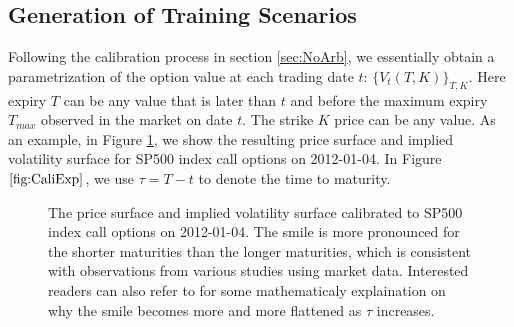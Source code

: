 \documentclass[letterpaper,12pt,titlepage,oneside,final]{book}
\numberwithin{equation}{section}
\theoremstyle{definition}
\begin{document}
\subsection{Generation of Training Scenarios}
\label{sec:Augtrain}
Following the calibration process in section \ref{sec:NoArb}, we essentially obtain a parametrization of the option value at each trading date $t$: $\{V_{t}(T,K)\}_{T,K}$. Here expiry $T$  can be any value that is later than $t$ and before  the maximum expiry $T_{max}$ observed in the market on date $t$. The strike $K$ price can be any  value.
As an example, in Figure \ref{fig:CaliExp}, we show the resulting price surface and implied  volatility surface for SP500 index call options  on 2012-01-04. In Figure $\ref{fig:CaliExp}$, we use $\tau=T-t$ to denote the time to maturity.
\begin{figure}[htp!]
	\centering
	\caption{The price surface and implied volatility surface calibrated to SP500 index call options on 2012-01-04. The smile is more pronounced for the shorter maturities than the longer maturities, which is consistent with observations from various studies \cite{chance2017bias,rogers2010can} using market data. Interested readers can also refer to \cite{rogers2010can} for some mathematicaly explaination on why the smile becomes more and more flattened as $\tau$ increases.}
	\label{fig:CaliExp}
\end{figure}
\end{document}
